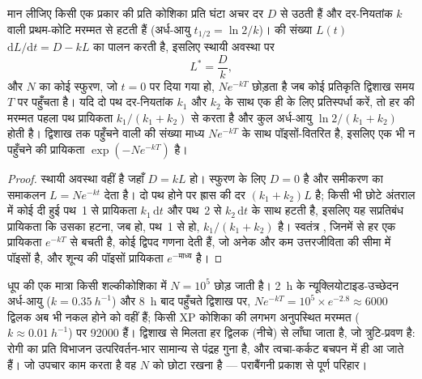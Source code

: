 \begin{theorem}[क्षति-भार, मरम्मत-दर और द्विशाख]\label{thm:b3:dna-repair:load}
मान लीजिए किसी एक प्रकार की  प्रति कोशिका प्रति घंटा अचर दर
$D$ से उठती हैं और दर-नियतांक $k$ वाली प्रथम-कोटि मरम्मत से हटती हैं
(अर्ध-आयु $t_{1/2} = \ln 2/k$)।  की संख्या $L(t)$
$\mathrm{d}L/\mathrm{d}t = D - kL$ का पालन करती है, इसलिए स्थायी अवस्था पर
\[
L^{*} = \frac{D}{k},
\]
और $N$  का कोई स्फुरण, जो $t = 0$ पर दिया गया हो,
$N e^{-kT}$  छोड़ता है जब कोई प्रतिकृति द्विशाख समय $T$ पर
पहुँचता है। यदि दो
पथ दर-नियतांक $k_{1}$ और $k_{2}$ के साथ एक ही  के लिए
प्रतिस्पर्धा करें, तो हर  की मरम्मत पहला पथ प्रायिकता
$k_{1}/(k_{1} +
k_{2})$ से करता है और कुल अर्ध-आयु $\ln 2/(k_{1} + k_{2})$ होती है।
द्विशाख तक पहुँचने वाली  की संख्या माध्य
$N e^{-kT}$ के साथ पॉइसों-वितरित है, इसलिए एक भी न पहुँचने की प्रायिकता $\exp(-N e^{-kT})$ है।
\end{theorem}
\begin{proof}
स्थायी अवस्था वहीं है जहाँ $D = kL$ हो। स्फुरण के लिए $D = 0$ है और
समीकरण का समाकलन $L = N e^{-kt}$ देता है। दो पथ होने पर ह्रास की
दर $(k_{1} + k_{2})L$ है; किसी भी छोटे अंतराल में कोई दी हुई 
पथ~1 से प्रायिकता $k_{1}\,\mathrm{d}t$ और पथ~2 से
$k_{2}\,\mathrm{d}t$ के साथ हटती है, इसलिए यह सप्रतिबंध प्रायिकता कि
उसका हटना, जब हो, पथ~1 से हो, $k_{1}/(k_{1} +
k_{2})$ है। स्वतंत्र , जिनमें से हर एक प्रायिकता $e^{-kT}$ से
बचती है, कोई द्विपद गणना देती हैं, जो अनेक  और कम उत्तरजीविता
की सीमा में पॉइसों है, और शून्य की पॉइसों प्रायिकता $e^{-\text{माध्य}}$ है।
\end{proof}

\begin{example}[ज़ीरोडर्मा द्विशाख का रोग क्यों है]\label{ex:b3:dna-repair:xp}
धूप की एक मात्रा किसी शल्कीकोशिका में $N = 10^{5}$ 
छोड़ जाती है। \qty{2}{h} के न्यूक्लियोटाइड-उच्छेदन अर्ध-आयु ($k =
\qty{0.35}{h^{-1}}$) और \qty{8}{h} बाद पहुँचते द्विशाख पर, $N e^{-kT} =
10^{5}\times e^{-2.8} \approx 6000$ द्विलक अब भी नकल होने को वहीं हैं;
किसी XP कोशिका की लगभग अनुपस्थित मरम्मत ($k \approx
\qty{0.01}{h^{-1}}$) पर \num{92000} हैं। द्विशाख से मिलता हर द्विलक
 (नीचे) से लाँघा जाता है, जो त्रुटि-प्रवण है:
रोगी का प्रति विभाजन उत्परिवर्तन-भार सामान्य से पंद्रह गुना है, और
त्वचा-कर्कट बचपन में ही आ जाते हैं। जो उपचार काम करता है वह $N$ को छोटा
रखना है --- पराबैंगनी प्रकाश से पूर्ण परिहार।
\end{example}

